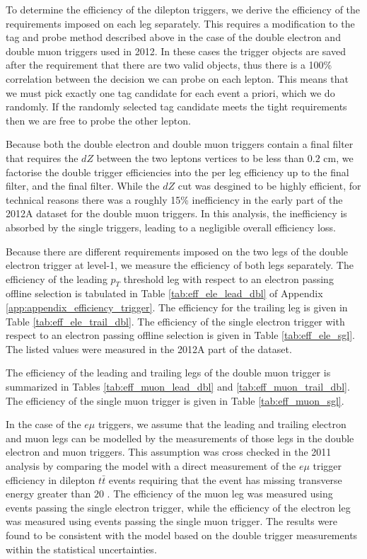  
To determine the efficiency of the dilepton triggers, 
we derive the efficiency of the requirements imposed on each leg separately.
This requires a modification to the tag and probe method described above in 
the case of the double electron and double muon triggers used in 2012.
In these cases the trigger objects are saved after the requirement that there are two valid objects, 
thus there is a 100\% correlation between the decision we can probe on each lepton.
This means that we must pick exactly one tag candidate for each event a priori, which we do 
randomly. 
If the randomly selected tag candidate meets the tight requirements then we are free to 
probe the other lepton.

Because both the double electron and double muon triggers
contain a final filter that requires the $dZ$ between the two
leptons vertices to be less than $0.2$ cm, we factorise the double trigger
efficiencies into the per leg efficiency up to the final filter, 
and the final filter. While the $dZ$ cut was desgined to be highly efficient,
for technical reasons there was a roughly 15\% inefficiency in
the early part of the 2012A dataset for the double muon triggers.
  In this analysis, the inefficiency
is absorbed by the single triggers, leading to a negligible overall 
efficiency loss.

Because there are different requirements imposed on the two legs of the 
double electron trigger at level-1, we measure the efficiency of 
both legs separately.
The efficiency of the leading $p_T$ threshold leg with respect to an electron passing
offline selection is tabulated in 
Table \ref{tab:eff_ele_lead_dbl} of Appendix 
\ref{app:appendix_efficiency_trigger}. The efficiency for the trailing 
leg is given in Table \ref{tab:eff_ele_trail_dbl}. 
The efficiency of the single electron trigger with respect to
an electron passing offline selection is given in Table \ref{tab:eff_ele_sgl}.
The listed values were measured in the 2012A part of the dataset.

The efficiency of the leading and trailing legs of the double muon trigger
is summarized in Tables \ref{tab:eff_muon_lead_dbl} and
\ref{tab:eff_muon_trail_dbl}. The efficiency of the single
muon trigger is given in Table \ref{tab:eff_muon_sgl}.

In the case of the $e\mu$ triggers, we assume that the leading
and trailing electron and muon legs can be modelled by the measurements
of those legs in the double electron and muon triggers. This assumption was cross 
checked in the 2011 analysis by comparing the model with
a direct measurement of the $e\mu$ trigger efficiency in
dilepton $t\bar{t}$ events requiring that the event has missing transverse
energy greater than $20$ \GeV.
The efficiency of 
the muon leg was measured using events passing the single electron trigger,
while the efficiency of the electron leg was measured using events passing the
single muon trigger. The results were found to be consistent
with the model based on the double trigger measurements within the 
statistical uncertainties. 

